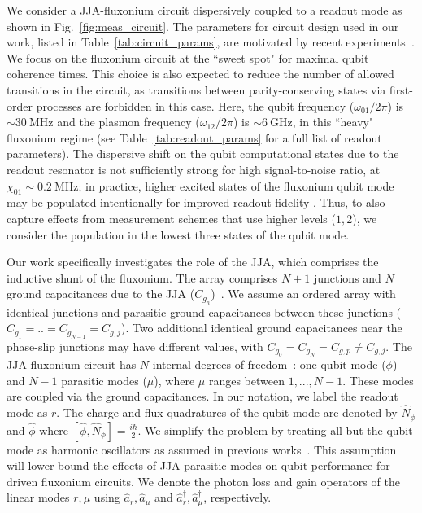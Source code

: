 \documentclass[%
reprint,
superscriptaddress,
 amsmath,amssymb,
 aps,
 prx,
longbibliography,
floatfix,
]{revtex4-2}
\begin{document}
We consider a JJA-fluxonium circuit dispersively coupled to a readout mode as shown in Fig.~\ref{fig:meas_circuit}. The parameters for circuit design used in our work, listed in Table~\ref{tab:circuit_params}, are motivated by recent experiments~\cite{zhang_tunable_2024,zhang_universal_2021}. We focus on the fluxonium circuit at the ``sweet spot" for maximal qubit coherence times. This choice is also expected to reduce the number of allowed transitions in the circuit, as transitions between parity-conserving states via first-order processes are forbidden in this case. Here, the qubit frequency ($\omega_{01}/2\pi$) is $\sim 30 \ \mathrm{MHz}$ and the plasmon frequency ($\omega_{12}/2\pi$) is $\sim 6 \ \mathrm{GHz}$, in this ``heavy" fluxonium regime (see Table~\ref{tab:readout_params} for a full list of readout parameters). The dispersive shift on the qubit computational states due to the readout resonator is not sufficiently strong for high signal-to-noise ratio, at $\chi_{01} \sim 0.2 \ \mathrm{MHz}$; in practice, higher excited states of the fluxonium qubit mode may be populated intentionally for improved readout fidelity \cite{zhang_universal_2021}. Thus, to also capture effects from measurement schemes that use higher levels ($1,2$), we consider the population in the lowest three states of the qubit mode. 

Our work specifically investigates the role of the JJA, which comprises the inductive shunt of the fluxonium. The array comprises $N+1$ junctions and $N$ ground capacitances due to the JJA ($C_{g_n}$)~\cite{manucharyan2009fluxonium}. We assume an ordered array with identical junctions and parasitic ground capacitances between these junctions ($C_{g_1}=..=C_{g_{N-1}}=C_{g,j}$). Two additional identical ground capacitances near the phase-slip junctions may have different values, with $C_{g_0}=C_{g_N}=C_{g,p}\neq C_{g, j}$. The JJA fluxonium circuit has $N$ internal degrees of freedom~\cite{ferguson2013symmetries,viola2015collective}: one qubit mode ($\phi$) and $N-1$ parasitic modes ($\mu$), where $\mu$ ranges between $1,...,N-1$. These  modes are coupled via the ground capacitances. 
In our notation, we label the readout mode as $r$. The charge and flux quadratures of the qubit mode are denoted by $\hat N_\phi$ and $\hat \phi$ where $[\hat \phi,\hat N_\phi]=\frac{i\hbar}{2}$. We simplify the problem by treating all but the qubit mode as harmonic oscillators as assumed in previous works~\cite{ferguson2013symmetries,viola2015collective,dumas2024unified}. This assumption will lower bound the effects of JJA parasitic modes on qubit performance for driven fluxonium circuits. We denote the photon loss and gain operators of the linear modes $r,\mu$ using $\hat a_r,\hat a_\mu$ and $\hat a_r^\dagger,\hat a_\mu^\dagger$, respectively. 
\end{document}
